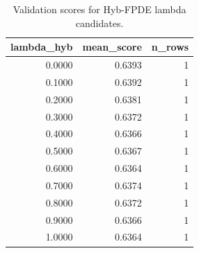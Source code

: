 \begin{table}[t]
\caption{Validation scores for Hyb-FPDE lambda candidates.}
\label{tab:lambda_distribution_computed}
\centering
\begin{tabular}{rrr}
\toprule
lambda\_hyb & mean\_score & n\_rows \\
\midrule
0.0000 & 0.6393 & 1 \\
0.1000 & 0.6392 & 1 \\
0.2000 & 0.6381 & 1 \\
0.3000 & 0.6372 & 1 \\
0.4000 & 0.6366 & 1 \\
0.5000 & 0.6367 & 1 \\
0.6000 & 0.6364 & 1 \\
0.7000 & 0.6374 & 1 \\
0.8000 & 0.6372 & 1 \\
0.9000 & 0.6366 & 1 \\
1.0000 & 0.6364 & 1 \\
\bottomrule
\end{tabular}

\end{table}
